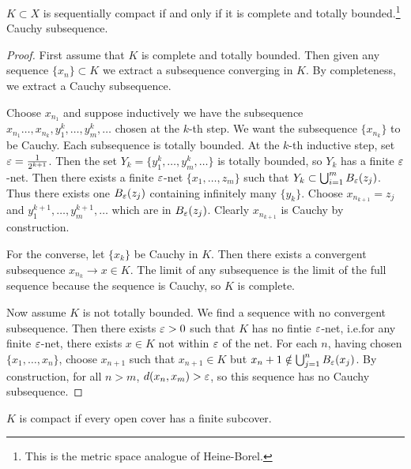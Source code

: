 \documentclass[10pt, twoside]{article}
\begin{document}
    \begin{thm} $K \subset X$ is sequentially compact if and only if it is
        complete and totally bounded.\footnote{This is the metric space
        analogue of Heine-Borel.} Cauchy subsequence.  \begin{proof} First
            assume that $K$ is complete and totally bounded. Then given any
            sequence $\{x_n\} \subset K$ we extract a subsequence converging in
            $K$. By completeness, we extract a Cauchy subsequence. 
            
            Choose $x_{n_1}$ and suppose inductively we have the subsequence
            $x_{n_1} \ldots, x_{n_k}, y_1^k, \ldots, y_m^k, \ldots$ chosen at
            the $k$-th step. We want the subsequence $\{x_{n_k}\}$ to be
            Cauchy. Each subsequence is totally bounded. At the $k$-th
            inductive step, set $\varepsilon = \frac{1}{2^{k+1}}$. Then the set $Y_k =
            \{y_1^k, \ldots, y_m^k, \ldots\}$ is totally bounded, so $Y_k$ has
            a finite $\varepsilon$-net. Then there exists a finite $\varepsilon$-net $\{x_1,
            \ldots, z_m\}$ such that $Y_k \subset \bigcup_{i=1}^m
            B_{\varepsilon}(z_j)$. Thus there exists one $B_{\varepsilon}(z_j)$ containing
            infinitely many $\{y_k\}$. Choose $x_{n_{k+1}} = z_j$ and
            $y_1^{k+1}, \ldots, y_m^{k+1}, \ldots$ which are in $B_{\varepsilon}(z_j)$.
            Clearly $x_{n_{k+1}}$ is Cauchy by construction.

            For the converse, let $\{x_k\}$ be Cauchy in $K$. Then there exists
            a convergent subsequence $x_{n_k} \rightarrow x \in K$. The limit
            of any subsequence is the limit of the full sequence because the
            sequence is Cauchy, so $K$ is complete.

            Now assume $K$ is not totally bounded. We find a sequence with no
        convergent subsequence. Then there exists $\varepsilon > 0$ such that $K$ has
    no fintie $\varepsilon$-net, i.e.for any finite $\varepsilon$-net, there exists $x \in K$
not within $\varepsilon$ of the net. For each $n$, having chosen $\{x_1, \ldots,
x_n\}$, choose $x_{n+1}$ such that $x_{n+1} \in K$ but $x_n+1 \notin
\bigcup_{j=1}^n B_{\varepsilon}(x_j)$. By construction, for all $n > m$, $d(x_n, x_m)
>\varepsilon$, so this sequence has no Cauchy subsequence.  \end{proof} \end{thm}

    \begin{defn} $K$ is compact if every open cover
    has a finite subcover.  \end{defn}
\end{document}
